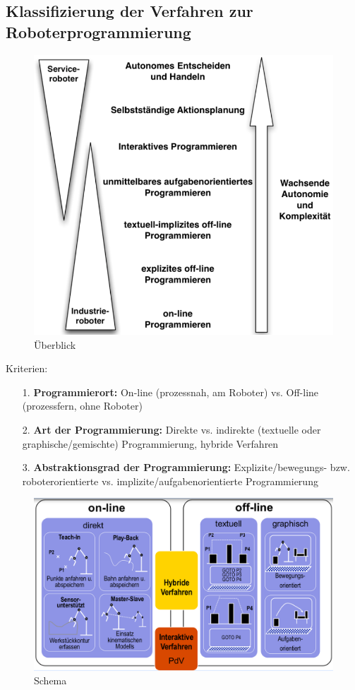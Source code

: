 \subsection{Klassifizierung der Verfahren zur Roboterprogrammierung}
\begin{figure}[ht]\centering 
\includegraphics[width=0.5\linewidth]{figures/ch01_ueberblick.png}
\caption{Überblick}
\label{fig:ch01_komp}
\end{figure}
Kriterien:
\begin{itemize}
\item[1.] \textbf{Programmierort:} On-line (prozessnah, am Roboter) vs. Off-line (prozessfern, ohne Roboter)
\item[2.] \textbf{Art der Programmierung:} Direkte vs. indirekte (textuelle oder graphische/gemischte) Programmierung, hybride Verfahren
\item[3.] \textbf{Abstraktionsgrad der Programmierung:} Explizite/bewegungs- bzw. roboterorientierte vs. implizite/aufgabenorientierte Programmierung
\end{itemize}
\begin{figure}[ht]\centering 
\includegraphics[width=\linewidth]{figures/ch01_schema.png}
\caption{Schema}
\label{fig:ch01_schema}
\end{figure}
